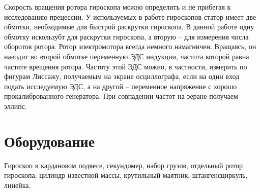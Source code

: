 \documentclass[a4paper,12pt]{article}
\begin{document}
	Скорость вращения ротора гироскопа можно определить и не прибегая к исследованию прецессии. У используемых в работе гироскопов статор имеет две обмотки, необходимые для быстрой раскрутки гироскопа. В данной работе одну обмотку искользубт для раскрутки гироскопа, а вторую -- для измерения числа оборотов ротора. Ротор электромотора всегда немного намагничен. Вращаясь, он наводит во второй обмотке переменную ЭДС индукции, частота которой равна частоте врещения ротора. Частоту этой ЭДС можно, в частности, измерить по фигурам Лиссажу, получаемым на экране осциллографа, если на один вход подать исследуемую ЭДС, а на другой -- переменное напряжение с хорошо прокалиброванного генератора. При совпадении частот на эеране получаем эллипс.

    \section{Оборудование}

	Гироскоп в кардановом подвесе, секундомер, набор грузов, отдельный ротор гироскопа, цилиндр известной массы, крутильный маятник, штангенсциркуль, линейка.
\end{document}
